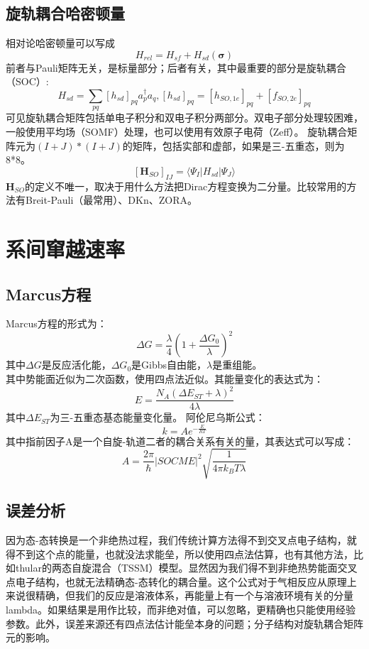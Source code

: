\documentclass[12pt, a4paper, oneside]{ctexart}
\begin{document}
\subsection{旋轨耦合哈密顿量}
  相对论哈密顿量可以写成
\begin{equation}
H_{rel}=H_{sf}+H_{sd}(\bm{\sigma})
\end{equation}
前者与Pauli矩阵无关，是标量部分；后者有关，其中最重要的部分是旋轨耦合（SOC）:
$$
H_{sd}=\sum_{pq}[h_{sd}]_{pq}a^{\dagger}_pa_q, [h_{sd}]_{pq}=[h_{SO,1e}]_{pq}+[f_{SO,2e}]_{pq}
$$
可见旋轨耦合矩阵包括单电子积分和双电子积分两部分。双电子部分处理较困难，一般使用平均场（SOMF）处理，也可以使用有效原子电荷（Zeff）。
旋轨耦合矩阵元为$(I+J)*(I+J)$的矩阵，包括实部和虚部，如果是三-五重态，则为8*8。
$$
[\bm{H}_{SO}]_{IJ}=\langle\Psi_I|H_{sd}|\Psi_J\rangle
$$
$\bm{H}_{SO}$的定义不唯一，取决于用什么方法把Dirac方程变换为二分量。比较常用的方法有Breit-Pauli（最常用）、DKn、ZORA。
\newpage


\section{系间窜越速率}
\subsection{Marcus方程}
Marcus方程的形式为：
$$
\Delta G=\frac{\lambda}{4}\left(1+\frac{\Delta G_0}{\lambda}\right)^2
$$
其中$\Delta G$是反应活化能，$\Delta G_0$是Gibbs自由能，$\lambda$是重组能。\\
其中势能面近似为二次函数，使用四点法近似。其能量变化的表达式为：
$$
E=\frac{N_{A}{({\Delta}E_{ST}+\lambda)}^2}{4{\lambda}}
$$
其中${\Delta}E_{ST}$为三-五重态基态能量变化量。
阿伦尼乌斯公式：
$$
k=Ae^{-\frac{E}{RT}}
$$
其中指前因子A是一个自旋-轨道二者的耦合关系有关的量，其表达式可以写成：
$$
A=\frac{2\pi}{\hbar}{|SOCME}|^2\sqrt{\frac{1}{4\pi k_BT\lambda}}
$$
\subsection{误差分析}
因为态-态转换是一个非绝热过程，我们传统计算方法得不到交叉点电子结构，就得不到这个点的能量，也就没法求能垒，所以使用四点法估算，也有其他方法，比如thular的两态自旋混合（TSSM）模型。显然因为我们得不到非绝热势能面交叉点电子结构，也就无法精确态-态转化的耦合量。这个公式对于气相反应从原理上来说很精确，但我们的反应是溶液体系，再能量上有一个与溶液环境有关的分量lambda。如果结果是用作比较，而非绝对值，可以忽略，更精确也只能使用经验参数。此外，误差来源还有四点法估计能垒本身的问题；分子结构对旋轨耦合矩阵元的影响。
\newpage
\end{document}
